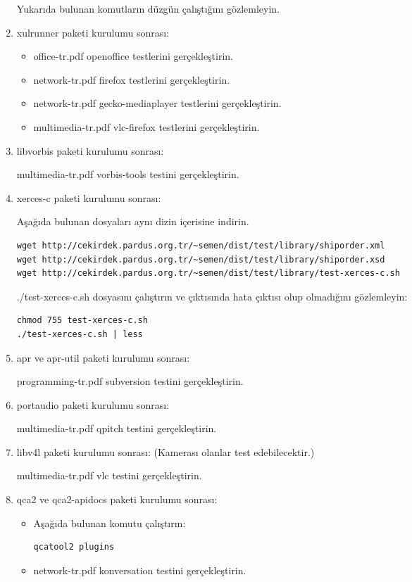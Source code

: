 \documentclass[a4paper,10pt]{article}
\begin{document}
\begin{enumerate}
Yukarıda bulunan komutların düzgün çalıştığını gözlemleyin.

\item xulrunner paketi kurulumu sonrası:
\begin{itemize}
\item office-tr.pdf openoffice testlerini gerçekleştirin.
\item network-tr.pdf firefox testlerini gerçekleştirin.
\item network-tr.pdf gecko-mediaplayer testlerini gerçekleştirin.
\item multimedia-tr.pdf vlc-firefox testlerini gerçekleştirin.
\end{itemize}

\item libvorbis paketi kurulumu sonrası:

multimedia-tr.pdf vorbis-tools testini gerçekleştirin.

\item xerces-c paketi kurulumu sonrası:

Aşağıda bulunan dosyaları aynı dizin içerisine indirin.
\begin{verbatim}
wget http://cekirdek.pardus.org.tr/~semen/dist/test/library/shiporder.xml
wget http://cekirdek.pardus.org.tr/~semen/dist/test/library/shiporder.xsd
wget http://cekirdek.pardus.org.tr/~semen/dist/test/library/test-xerces-c.sh
\end{verbatim}

./test-xerces-c.sh dosyasını çalıştırın ve çıktısında hata çıktısı olup olmadığını gözlemleyin:
\begin{verbatim}
chmod 755 test-xerces-c.sh
./test-xerces-c.sh | less
\end{verbatim}

\item apr ve apr-util paketi kurulumu sonrası:

programming-tr.pdf subversion testini gerçekleştirin.

\item portaudio paketi kurulumu sonrası:

multimedia-tr.pdf qpitch testini gerçekleştirin.

\item libv4l paketi kurulumu sonrası: (Kamerası olanlar test edebilecektir.)


multimedia-tr.pdf vlc testini gerçekleştirin.

\item qca2 ve qca2-apidocs paketi kurulumu sonrası:
\begin{itemize}
 \item Aşağıda bulunan komutu çalıştırın:
\begin{verbatim}
qcatool2 plugins 
\end{verbatim}
\item network-tr.pdf konversation testini gerçekleştirin.
\end{itemize}


\end{enumerate}
\end{document}
